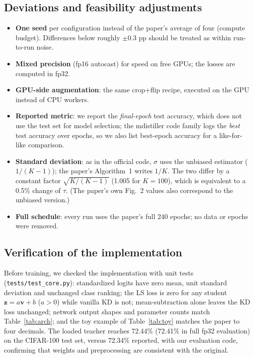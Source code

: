 \documentclass[12pt,a4paper]{article}
\begin{document}
\subsection{Deviations and feasibility adjustments}
\begin{itemize}[nosep]
\item \textbf{One seed} per configuration instead of the paper's average of four (compute budget). Differences below roughly $\pm0.3$ pp should be treated as within run-to-run noise.
\item \textbf{Mixed precision} (fp16 autocast) for speed on free GPUs; the losses are computed in fp32.
\item \textbf{GPU-side augmentation}: the same crop+flip recipe, executed on the GPU instead of CPU workers.
\item \textbf{Reported metric}: we report the \emph{final-epoch} test accuracy, which does not use the test set for model selection; the mdistiller code family logs the \emph{best} test accuracy over epochs, so we also list best-epoch accuracy for a like-for-like comparison.
\item \textbf{Standard deviation}: as in the official code, $\sigma$ uses the unbiased estimator ($1/(K{-}1)$); the paper's Algorithm~1 writes $1/K$. The two differ by a constant factor $\sqrt{K/(K-1)}$ (1.005 for $K{=}100$), which is equivalent to a 0.5\% change of $\tau$. (The paper's own Fig.~2 values also correspond to the unbiased version.)
\item \textbf{Full schedule}: every run uses the paper's full 240 epochs; no data or epochs were removed.
\end{itemize}

\subsection{Verification of the implementation}
Before training, we checked the implementation with unit tests (\texttt{tests/test\_core.py}): standardized logits have zero mean, unit standard deviation and unchanged class ranking; the LS loss is zero for any student $\mathbf{z}=a\mathbf{v}+b$ ($a>0$) while vanilla KD is not; mean-subtraction alone leaves the KD loss unchanged; network output shapes and parameter counts match Table~\ref{tab:arch}; and the toy example of Table~\ref{tab:toy} matches the paper to four decimals. The loaded teacher reaches 72.44\% (72.41\% in full fp32 evaluation) on the CIFAR-100 test set, versus 72.34\% reported, with our evaluation code, confirming that weights and preprocessing are consistent with the original.
\end{document}

